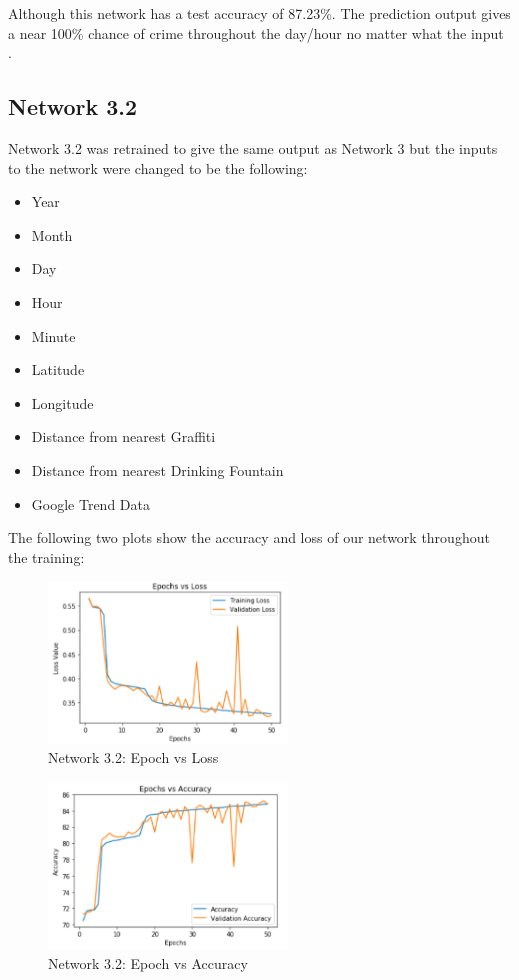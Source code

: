 \documentclass[conference]{IEEEtran}
\begin{document}
Although this network has a test accuracy of 87.23\%. The prediction output gives a near 100\% chance of crime throughout the day/hour no
matter what the input \cite{Network_3.1}.

\subsection{Network 3.2 \cite{Network_3.2}}

Network 3.2 was retrained to give the same output as Network 3 but the inputs to the network were changed to be the following:

\begin{itemize}
  \item Year
  \item Month
  \item Day
  \item Hour
  \item Minute
  \item Latitude
  \item Longitude
  \item Distance from nearest Graffiti
  \item Distance from nearest Drinking Fountain
  \item Google Trend Data
\end{itemize}

The following two plots show the accuracy and loss of our network throughout the training:

\begin{figure}[H]
  \centering
  \captionsetup{justification=centering}
  \centering
  \includegraphics[width=2.5in]{21.png}
  \caption{Network 3.2: Epoch vs Loss}  
  \label{1}
\end{figure}

\begin{figure}[H]
  \centering
  \captionsetup{justification=centering}
  \centering
  \includegraphics[width=2.5in]{22.png}
  \caption{Network 3.2: Epoch vs Accuracy}  
  \label{1}
\end{figure}
\end{document}
